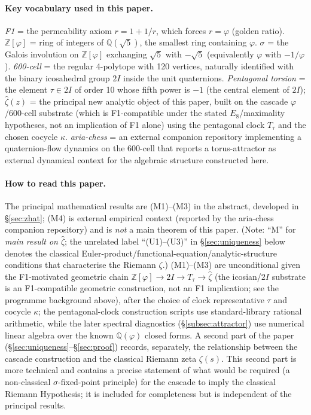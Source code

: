 \documentclass[11pt, a4paper]{amsart}
\theoremstyle{definition}
\newcommand{\Q}{\mathbb{Q}}
\begin{document}
\paragraph{Key vocabulary used in this paper.}
\emph{F1} = the permeability axiom $r = 1 + 1/r$, which forces
$r = \varphi$ (golden ratio). \emph{$\mathbb{Z}[\varphi]$} = ring
of integers of $\mathbb{Q}(\sqrt{5})$, the smallest ring
containing $\varphi$. \emph{$\sigma$} = the Galois involution on
$\mathbb{Z}[\varphi]$ exchanging $\sqrt{5}$ with $-\sqrt{5}$
(equivalently $\varphi$ with $-1/\varphi$). \emph{600-cell} = the
regular 4-polytope with 120 vertices, naturally identified with
the binary icosahedral group $2I$ inside the unit quaternions.
\emph{Pentagonal torsion} = the element $\tau \in 2I$ of order 10
whose fifth power is $-1$ (the central element of $2I$);
\emph{$\widehat\zeta(z)$} = the principal new analytic object of
this paper, built on the cascade $\varphi$/600-cell substrate
(which is F1-compatible under the stated $E_8$/maximality
hypotheses, not an implication of F1 alone) using the pentagonal clock
$T_\tau$ and the chosen cocycle $\kappa$.
\emph{aria-chess} = an external companion repository implementing a
quaternion-flow dynamics on the 600-cell that reports a
torus-attractor as external dynamical context for the algebraic
structure constructed here.

\paragraph{How to read this paper.}
The principal mathematical results are (M1)--(M3) in the abstract,
developed in §\ref{sec:zhat}; (M4) is external empirical context
(reported by the aria-chess companion repository) and is \emph{not}
a main theorem of this paper.  (Note: ``M'' for \emph{main result
on $\widehat\zeta$}; the unrelated label ``(U1)--(U3)'' in
§\ref{sec:uniqueness} below denotes the classical
Euler-product/functional-equation/analytic-structure conditions
that characterise the Riemann $\zeta$.)  (M1)--(M3) are unconditional given
the F1-motivated geometric chain $\mathbb{Z}[\varphi] \to 2I \to
T_\tau \to \widehat\zeta$ (the icosian/$2I$ substrate is an
F1-compatible geometric construction, not an F1 implication; see
the programme background above), after the choice of clock
representative $\tau$ and cocycle $\kappa$; the
pentagonal-clock construction scripts use standard-library rational
arithmetic, while the later spectral diagnostics
(\S\ref{subsec:attractor}) use numerical linear algebra over the
known $\Q(\varphi)$ closed forms. A second part of the
paper (§\ref{sec:uniqueness}--§\ref{sec:proof}) records, separately,
the relationship between the cascade construction and the classical
Riemann zeta $\zeta(s)$. This second part is more technical and
contains a precise statement of what would be required (a
non-classical $\sigma$-fixed-point principle) for the cascade to
imply the classical Riemann Hypothesis; it is included for
completeness but is independent of the principal results.
\end{document}
